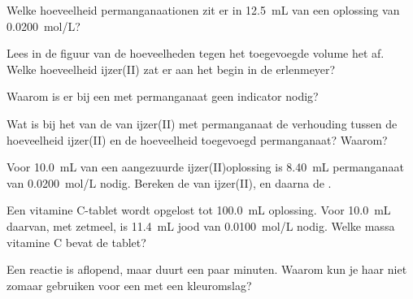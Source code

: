 \begin{exercise}[$\star$]\label{exo:g11:titration:2}
Welke hoeveelheid permanganaationen zit er in \qty{12.5}{mL} van een
oplossing van \qty{0.0200}{mol/L}?
\end{exercise}

\begin{exercise}[$\star$]\label{exo:g11:titration:3}
Lees in de figuur van de hoeveelheden tegen het toegevoegde volume het
 af. Welke hoeveelheid ijzer(II) zat er aan het begin
in de erlenmeyer?
\end{exercise}

\begin{exercise}[$\star$]\label{exo:g11:titration:4}
Waarom is er bij een  met permanganaat geen indicator nodig?
\end{exercise}

\begin{exercise}[$\star$]\label{exo:g11:titration:5}
Wat is bij het  van de  van ijzer(II) met
permanganaat de verhouding tussen de hoeveelheid ijzer(II) en de
hoeveelheid toegevoegd permanganaat? Waarom?
\end{exercise}

\begin{exercise}[$\star\star$]\label{exo:g11:titration:6}
Voor \qty{10.0}{mL} van een aangezuurde ijzer(II)oplossing is
\qty{8.40}{mL} permanganaat van \qty{0.0200}{mol/L} nodig. Bereken de
 van ijzer(II), en daarna de .
\end{exercise}

\begin{exercise}[$\star\star$]\label{exo:g11:titration:7}
Een vitamine C-tablet wordt opgelost tot \qty{100.0}{mL} oplossing.
Voor \qty{10.0}{mL} daarvan, met zetmeel, is \qty{11.4}{mL} jood van
\qty{0.0100}{mol/L} nodig. Welke massa vitamine C bevat de tablet?
\end{exercise}

\begin{exercise}[$\star\star$]\label{exo:g11:titration:8}
Een reactie is aflopend, maar duurt een paar minuten. Waarom kun je haar
niet zomaar gebruiken voor een  met een kleuromslag?
\end{exercise}

